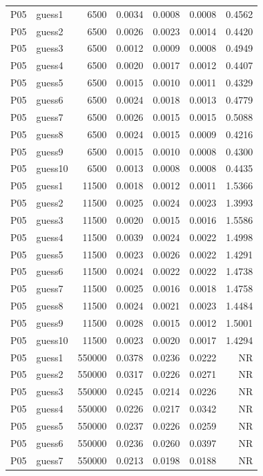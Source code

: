 {\begin{longtable}{llrrrrr}
P05 & guess1 & 6500 & 0.0034 & 0.0008 & 0.0008 & 0.4562 \\
P05 & guess2 & 6500 & 0.0026 & 0.0023 & 0.0014 & 0.4420 \\
P05 & guess3 & 6500 & 0.0012 & 0.0009 & 0.0008 & 0.4949 \\
P05 & guess4 & 6500 & 0.0020 & 0.0017 & 0.0012 & 0.4407 \\
P05 & guess5 & 6500 & 0.0015 & 0.0010 & 0.0011 & 0.4329 \\
P05 & guess6 & 6500 & 0.0024 & 0.0018 & 0.0013 & 0.4779 \\
P05 & guess7 & 6500 & 0.0026 & 0.0015 & 0.0015 & 0.5088 \\
P05 & guess8 & 6500 & 0.0024 & 0.0015 & 0.0009 & 0.4216 \\
P05 & guess9 & 6500 & 0.0015 & 0.0010 & 0.0008 & 0.4300 \\
P05 & guess10 & 6500 & 0.0013 & 0.0008 & 0.0008 & 0.4435 \\
P05 & guess1 & 11500 & 0.0018 & 0.0012 & 0.0011 & 1.5366 \\
P05 & guess2 & 11500 & 0.0025 & 0.0024 & 0.0023 & 1.3993 \\
P05 & guess3 & 11500 & 0.0020 & 0.0015 & 0.0016 & 1.5586 \\
P05 & guess4 & 11500 & 0.0039 & 0.0024 & 0.0022 & 1.4998 \\
P05 & guess5 & 11500 & 0.0023 & 0.0026 & 0.0022 & 1.4291 \\
P05 & guess6 & 11500 & 0.0024 & 0.0022 & 0.0022 & 1.4738 \\
P05 & guess7 & 11500 & 0.0025 & 0.0016 & 0.0018 & 1.4758 \\
P05 & guess8 & 11500 & 0.0024 & 0.0021 & 0.0023 & 1.4484 \\
P05 & guess9 & 11500 & 0.0028 & 0.0015 & 0.0012 & 1.5001 \\
P05 & guess10 & 11500 & 0.0023 & 0.0020 & 0.0017 & 1.4294 \\
P05 & guess1 & 550000 & 0.0378 & 0.0236 & 0.0222 & NR \\
P05 & guess2 & 550000 & 0.0317 & 0.0226 & 0.0271 & NR \\
P05 & guess3 & 550000 & 0.0245 & 0.0214 & 0.0226 & NR \\
P05 & guess4 & 550000 & 0.0226 & 0.0217 & 0.0342 & NR \\
P05 & guess5 & 550000 & 0.0237 & 0.0226 & 0.0259 & NR \\
P05 & guess6 & 550000 & 0.0236 & 0.0260 & 0.0397 & NR \\
P05 & guess7 & 550000 & 0.0213 & 0.0198 & 0.0188 & NR \\

\end{longtable}}
